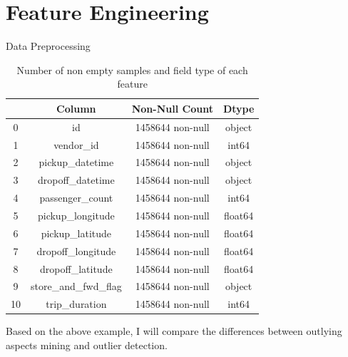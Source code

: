 \documentclass[
 size=14pt,
 paper=smartboard,  %
 mode=present, 		%
 display=slides, 	%
 style=tuliplab,  	%
 pauseslide,
 fleqn,leqno]{powerdot}
\begin{document}
\section{Feature Engineering}




\begin{slide}{Data Preprocessing}

\begin{table}[]
\setlength{\abovecaptionskip}{0pt}
\setlength{\belowcaptionskip}{10pt}
\centering
\caption{Number of non empty samples and field type of each feature}
\begin{tabular}{cccc}
\hline
\textbf{} & \textbf{Column}       & \textbf{Non-Null Count} & \textbf{Dtype} \\
\hline
0         & id                    & 1458644 non-null        & object         \\
1         & vendor\_id            & 1458644 non-null        & int64          \\
2         & pickup\_datetime      & 1458644 non-null        & object         \\
3         & dropoff\_datetime     & 1458644 non-null        & object         \\
4         & passenger\_count      & 1458644 non-null        & int64          \\
5         & pickup\_longitude     & 1458644 non-null        & float64        \\
6         & pickup\_latitude      & 1458644 non-null        & float64        \\
7         & dropoff\_longitude    & 1458644 non-null        & float64        \\
8         & dropoff\_latitude     & 1458644 non-null        & float64        \\
9         & store\_and\_fwd\_flag & 1458644 non-null        & object         \\
10        & trip\_duration        & 1458644 non-null        & int64         \\
\hline
\end{tabular}
\end{table}


\begin{note}
Based on the above example,
I will compare the differences
between outlying aspects mining and outlier detection.


\end{note}
\end{slide}
\end{document}
